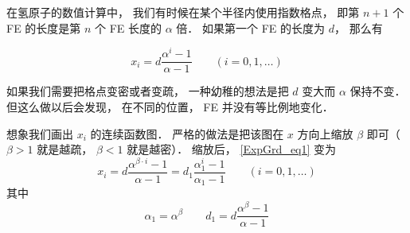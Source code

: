 

在氢原子的数值计算中， 我们有时候在某个半径内使用指数格点， 即第 $n+1$ 个 FE 的长度是第 $n$ 个 FE 长度的 $\alpha$ 倍． 如果第一个 FE 的长度为 $d$， 那么有

\begin{equation}\label{ExpGrd_eq1}
x_i = d \frac{\alpha^i - 1}{\alpha - 1}
\qquad (i = 0, 1, \dots)
\end{equation}

如果我们需要把格点变密或者变疏， 一种幼稚的想法是把 $d$ 变大而 $\alpha$ 保持不变． 但这么做以后会发现， 在不同的位置， FE 并没有等比例地变化．

想象我们画出 $x_i$ 的连续函数图． 严格的做法是把该图在 $x$ 方向上缩放 $\beta$ 即可（$\beta > 1$ 就是越疏， $\beta < 1$ 就是越密）． 缩放后， \autoref{ExpGrd_eq1} 变为
\begin{equation}
x_i = d \frac{\alpha^{\beta \cdot i} - 1}{\alpha - 1}
= d_1 \frac{\alpha_1^i - 1}{\alpha_1 - 1}
\qquad (i = 0, 1, \dots)
\end{equation}
其中
\begin{equation}
\alpha_1 = \alpha^\beta
\qquad
d_1 = d \frac{{\alpha^\beta - 1}}{\alpha - 1}
\end{equation}
